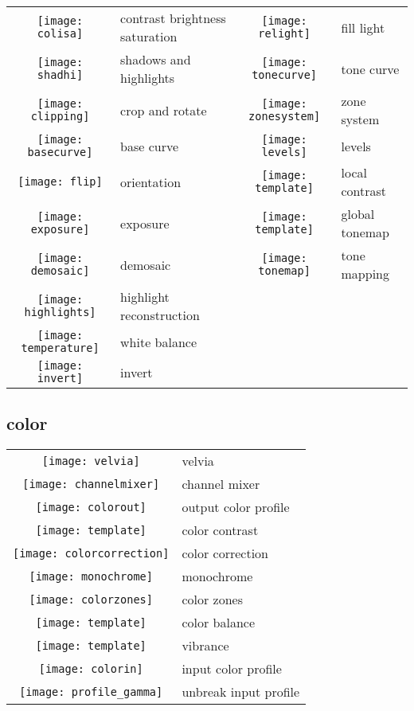 \documentclass[\ArgLang,\ArgFormat,9pt]{extarticle}
\begin{document}
\begin{multicols}{3}
  \colorbox{keycol}{%
    \begin{tabularx}{\tabwidth}{clcl}
      \texttt{[image: colisa]} & contrast brightness saturation & \texttt{[image: relight]} & fill light \\
      \texttt{[image: shadhi]} & shadows and highlights         & \texttt{[image: tonecurve]} & tone curve \\
      \texttt{[image: clipping]} & crop and rotate              & \texttt{[image: zonesystem]} & zone system \\
      \texttt{[image: basecurve]} & base curve                  & \texttt{[image: levels]} & levels \\
      \texttt{[image: flip]} & orientation                      & \texttt{[image: template]} & local contrast \\
      \texttt{[image: exposure]} & exposure                     & \texttt{[image: template]} & global tonemap \\
      \texttt{[image: demosaic]} & demosaic                     & \texttt{[image: tonemap]} & tone mapping \\
      \texttt{[image: highlights]} & highlight reconstruction \\
      \texttt{[image: temperature]} & white balance \\
      \texttt{[image: invert]} & invert \\
    \end{tabularx}}
  
  \subsection{color}

  \colorbox{keycol}{%
    \begin{tabularx}{\tabwidth}{cl} 
      \texttt{[image: velvia]} & velvia \\
      \texttt{[image: channelmixer]} & channel mixer \\
      \texttt{[image: colorout]} & output color profile \\
      \texttt{[image: template]} & color contrast \\
      \texttt{[image: colorcorrection]} & color correction \\
      \texttt{[image: monochrome]} & monochrome \\
      \texttt{[image: colorzones]} & color zones \\
      \texttt{[image: template]} & color balance \\
      \texttt{[image: template]} & vibrance \\
      \texttt{[image: colorin]} & input color profile \\
      \texttt{[image: profile\_gamma]} & unbreak input profile \\
    \end{tabularx}}


\end{multicols}
\end{document}
